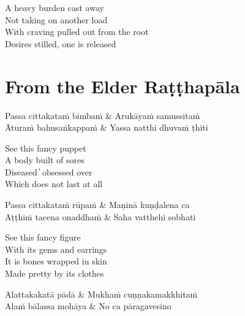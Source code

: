 \begin{english}
  A heavy burden cast away\\
  Not taking on another load\\
  With craving pulled out from the root\\
  Desires stilled, one is released
\end{english}


\clearpage

\section{From the Elder Raṭṭhapāla}

\begin{leader}
\end{leader}

\begin{twochants}
  Passa cittakataṁ bimbaṁ & Arukāyaṁ samussitaṁ\\
  Āturaṁ bahusaṅkappaṁ & Yassa natthi dhuvaṁ ṭhiti\\
\end{twochants}

\begin{english}
  See this fancy puppet\\
  A body built of sores\\
  Diseased  ̓  obsessed over\\
  Which does not last at all
\end{english}

\begin{twochants}
  Passa cittakataṁ rūpaṁ & Maṇinā kuṇḍalena ca\\
  Aṭṭhiṁ tacena onaddhaṁ & Saha vatthehi sobhati\\
\end{twochants}

\begin{english}
  See this fancy figure\\
  With its gems and earrings\\
  It is bones wrapped in skin\\
  Made pretty by its clothes
\end{english}

\begin{twochants}
  Alattakakatā pādā & Mukhaṁ cuṇṇakamakkhitaṁ\\
  Alaṁ bālassa mohāya & No ca pāragavesino\\
\end{twochants}

